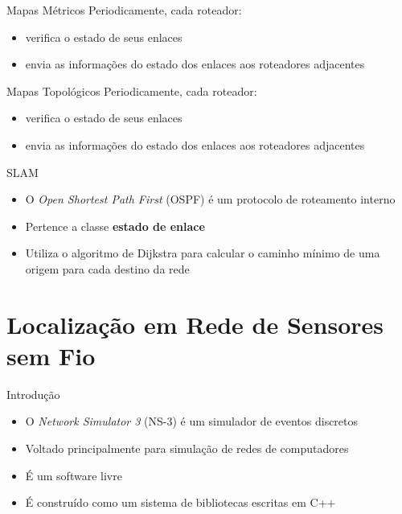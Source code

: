 \documentclass{beamer}
\newlength{\wideitemsep}
\let\olditem\item
\renewcommand{\item}{\setlength{\itemsep}{\wideitemsep}\olditem}
\begin{document}
\begin{frame}{Mapas Métricos}
Periodicamente, cada roteador:
\begin{itemize}
 \olditem verifica o estado de seus enlaces %
 \olditem envia as informações do estado dos enlaces aos roteadores adjacentes %
\end{itemize}
\end{frame}

\begin{frame}{Mapas Topológicos}
Periodicamente, cada roteador:
\begin{itemize}
 \olditem verifica o estado de seus enlaces %
 \olditem envia as informações do estado dos enlaces aos roteadores adjacentes %
\end{itemize}
\end{frame}

\begin{frame}{SLAM}
\begin{itemize}
 \item O \textit{Open Shortest Path First} (OSPF) é um protocolo de roteamento interno %
 \item Pertence a classe \textbf{estado de enlace} %
 \item Utiliza o algoritmo de Dijkstra para calcular o caminho mínimo de uma origem para cada destino da rede %
\end{itemize}
\end{frame}

\section{Localização em Rede de Sensores sem Fio} %

\begin{frame}{Introdução}
\begin{itemize}
 \item O \textit{Network Simulator 3} (NS-3) é um simulador de eventos discretos %
 \item Voltado principalmente para simulação de redes de computadores %
 \item É um software livre %
 \item É construído como um sistema de bibliotecas escritas em C++ %
\end{itemize}
\end{frame}
\end{document}
